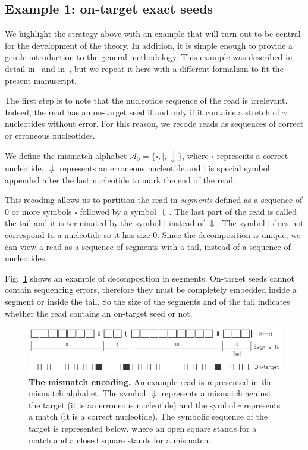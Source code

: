 \documentclass{article}
\begin{document}
\subsection{Example 1: on-target exact seeds}
\label{sec:example_exact}

We highlight the strategy above with an example that will turn out to be
central for the development of the theory. In addition, it is simple
enough to provide a gentle introduction to the general methodology. This
example was described in detail in~\cite{filion2017analytic} and
in~\cite{filion2018analytic}, but we repeat it here with a different
formalism to fit the present manuscript.

The first step is to note that the nucleotide sequence of the read is
irrelevant. Indeed, the read has an on-target seed if and only if it
contains a stretch of $\gamma$ nucleotides without error. For this reason,
we recode reads as sequences of correct or erroneous nucleotides.

We define the mismatch alphabet $\mathcal{A}_0 = \{\square, |,
\Downarrow\}$, where $\square$ represents a correct nucleotide,
$\Downarrow$ represents an erroneous nucleotide and $|$ is special symbol
appended after the last nucleotide to mark the end of the read.

This recoding allows us to partition the read in \emph{segments} defined
as a sequence of 0 or more symbols $\square$ followed by a symbol
$\Downarrow$. The last part of the read is called the tail and it is
terminated by the symbol $|$ instead of $\Downarrow$. The symbol $|$ does
not correspond to a nucleotide so it has size 0. Since the decomposition
is unique, we can view a read as a sequence of segments with a tail,
instead of a sequence of nucleotides.

Fig.~\ref{fig:simple} shows an example of decomposition in segments.
On-target seeds cannot contain sequencing errors, therefore they must be
completely embedded inside a segment or inside the tail. So the size of
the segments and of the tail indicates whether the read contains an
on-target seed or not.

\begin{figure}[h]
\centering
\includegraphics[scale=0.85]{sketch_simple.pdf}
\caption{\textbf{The mismatch encoding.}
An example read is represented in the mismatch alphabet. The symbol
$\Downarrow$ represents a mismatch against the target (it is an erroneous
nucleotide) and the symbol $\square$ represents a match (it is a correct
nucleotide). The symbolic sequence of the target is represented below,
where an open square stands for a match and a closed square stands for a
mismatch.}
\label{fig:simple}
\end{figure}
\end{document}
